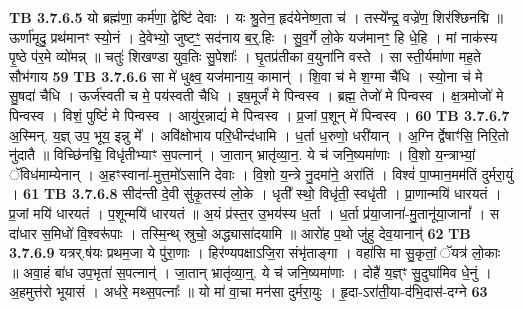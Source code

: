 \documentclass[17pt]{extarticle}
\begin{document}
{{{{{{{{{{{{{{{{{{{                  \newline
                                \textbf{ TB 3.7.6.5} \newline
                  यो ब्रह्म॑णा॒ कर्म॑णा॒ द्वेष्टि॑ देवाः । यः श्रु॒तेन॒ हृद॑येनेष्ण॒ता च॑ । तस्ये᳚न्द्र॒ वज्रे॑ण॒ शिर॑श्छिनद्मि ॥ ऊर्णा॑मृदु॒ प्रथ॑मानꣳ स्यो॒नं । दे॒वेभ्यो॒ जुष्टꣳ॒॒ सद॑नाय ब॒र्॒.हिः । सु॒व॒र्गे लो॒के यज॑मानꣳ॒॒ हि धे॒हि । मां नाक॑स्य पृ॒ष्ठे प॑र॒मे व्यो॑मन्न् ॥ चतुः॑ शिखण्डा युव॒तिः सु॒पेशाः᳚ । घृ॒तप्र॑तीका व॒युना॑नि वस्ते । सा स्ती॒र्यमा॑णा मह॒ते सौभ॑गाय \textbf{ 59} \newline
                  \newline
                                \textbf{ TB 3.7.6.6} \newline
                  सा मे॑ धुक्ष्व॒ यज॑मानाय॒ कामान्॑ । शि॒वा च॑ मे श॒ग्मा चै॑धि । स्यो॒ना च॑ मे सु॒षदा॑ चैधि । ऊर्ज॑स्वती च मे॒ पय॑स्वती चैधि । इष॒मूर्जं॑ मे पिन्वस्व । ब्रह्म॒ तेजो॑ मे पिन्वस्व । क्ष॒त्रमोजो॑ मे पिन्वस्व । विशं॒ पुष्टिं॑ मे पिन्वस्व । आयु॑र॒न्नाद्यं॑ मे पिन्वस्व । प्र॒जां प॒शून् मे॑ पिन्वस्व । \textbf{ 60} \newline
                  \newline
                                \textbf{ TB 3.7.6.7} \newline
                  अ॒स्मिन्. य॒ज्ञ् उप॒ भूय॒ इन्नु मे᳚ । अवि॑क्षोभाय परि॒धीन्द॑धामि । ध॒र्ता ध॒रुणो॒ धरी॑यान् । अ॒ग्नि र्द्वेषाꣳ॑सि॒ निरि॒तो नु॑दातै ॥ विच्छि॑नद्मि॒ विधृ॑तीभ्याꣳ स॒पत्नान्॑ । जा॒तान् भ्रातृ॑व्या॒न॒. ये च॑ जनि॒ष्यमा॑णाः । वि॒शो य॒न्त्राभ्यां॒ ॅविध॑माम्येनान् । अ॒हꣳस्वाना॑-मुत्त॒मो॑ऽसानि देवाः । वि॒शो य॒न्त्रे नु॒दमा॑ने॒ अरा॑तिं । विश्वं॑ पा॒प्मान॒मम॑तिं दुर्मरा॒युं । \textbf{ 61} \newline
                  \newline
                                \textbf{ TB 3.7.6.8} \newline
                  सीद॑न्ती दे॒वी सु॑कृ॒तस्य॑ लो॒के । धृती᳚ स्थो॒ विधृ॑ती॒ स्वधृ॑ती । प्रा॒णान्मयि॑ धारयतं । प्र॒जां मयि॑ धारयतं । प॒शून्मयि॑ धारयतं ॥ अ॒यं प्र॑स्त॒र उ॒भय॑स्य ध॒र्ता । ध॒र्ता प्र॑या॒जाना॑-मु॒तानू॑या॒जानां᳚ । स दा॑धार स॒मिधो॑ वि॒श्वरू॑पाः । तस्मि॒न्थ् स्रुचो॒ अद्ध्यासा॑दयामि ॥ आरो॑ह प॒थो जु॑हु देव॒यानान्॑ \textbf{ 62} \newline
                  \newline
                                \textbf{ TB 3.7.6.9} \newline
                  यत्रर्.ष॑यः प्रथम॒जा ये पु॑रा॒णाः । हिर॑ण्यपक्षाऽजि॒रा संभृ॑ताङ्गा । वहा॑सि मा सु॒कृतां॒ ॅयत्र॑ लो॒काः ॥ अवा॒हं बा॑ध उप॒भृता॑ स॒पत्नान्॑ । जा॒तान् भ्रातृ॑व्या॒न्॒. ये च॑ जनि॒ष्यमा॑णाः । दोहै॑ य॒ज्ञ्ꣳ सु॒दुघा॑मिव धे॒नुं । अ॒हमुत्त॑रो भूयासं । अध॑रे॒ मथ्स॒पत्नाः᳚ ॥ यो मा॑ वा॒चा मन॑सा दुर्मरा॒युः । हृ॒दा-ऽरा॑ती॒या-द॑भि॒दास॑-दग्ने \textbf{ 63} \newline
}}}}}}}}}}}}}}}}}}}
\end{document}
